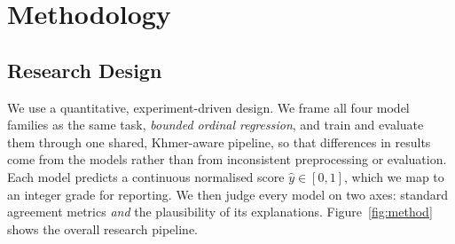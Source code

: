 \chapter{Methodology}
\label{ch:methodology}

\section{Research Design}
\label{sec:design}
We use a quantitative, experiment-driven design. We frame all four model families as the same task,
\emph{bounded ordinal regression}, and train and evaluate them through one shared, Khmer-aware
pipeline, so that differences in results come from the models rather than from inconsistent
preprocessing or evaluation. Each model predicts a continuous normalised score $\hat{y}\in[0,1]$, which
we map to an integer grade for reporting. We then judge every model on two axes: standard agreement
metrics \emph{and} the plausibility of its explanations. Figure~\ref{fig:method} shows the overall
research pipeline.

